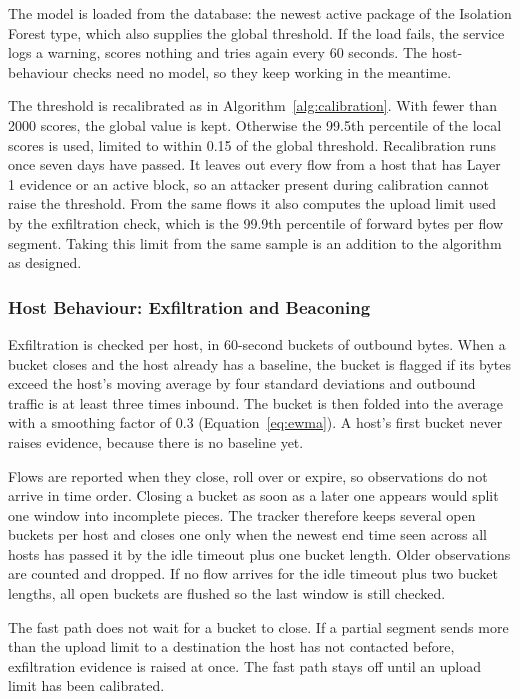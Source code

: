 \noindent The model is loaded from the database: the newest active package of the Isolation Forest type, which also supplies the global threshold. If the load fails, the service logs a warning, scores nothing and tries again every 60 seconds. The host-behaviour checks need no model, so they keep working in the meantime.

\noindent The threshold is recalibrated as in Algorithm~\ref{alg:calibration}. With fewer than 2000 scores, the global value is kept. Otherwise the 99.5th percentile of the local scores is used, limited to within 0.15 of the global threshold. Recalibration runs once seven days have passed. It leaves out every flow from a host that has Layer 1 evidence or an active block, so an attacker present during calibration cannot raise the threshold. From the same flows it also computes the upload limit used by the exfiltration check, which is the 99.9th percentile of forward bytes per flow segment. Taking this limit from the same sample is an addition to the algorithm as designed.

\subsubsection{Host Behaviour: Exfiltration and Beaconing}\label{sec:7.1.7.2}

\noindent Exfiltration is checked per host, in 60-second buckets of outbound bytes. When a bucket closes and the host already has a baseline, the bucket is flagged if its bytes exceed the host's moving average by four standard deviations and outbound traffic is at least three times inbound. The bucket is then folded into the average with a smoothing factor of 0.3 (Equation~\ref{eq:ewma}). A host's first bucket never raises evidence, because there is no baseline yet.

\noindent Flows are reported when they close, roll over or expire, so observations do not arrive in time order. Closing a bucket as soon as a later one appears would split one window into incomplete pieces. The tracker therefore keeps several open buckets per host and closes one only when the newest end time seen across all hosts has passed it by the idle timeout plus one bucket length. Older observations are counted and dropped. If no flow arrives for the idle timeout plus two bucket lengths, all open buckets are flushed so the last window is still checked.

\noindent The fast path does not wait for a bucket to close. If a partial segment sends more than the upload limit to a destination the host has not contacted before, exfiltration evidence is raised at once. The fast path stays off until an upload limit has been calibrated.


